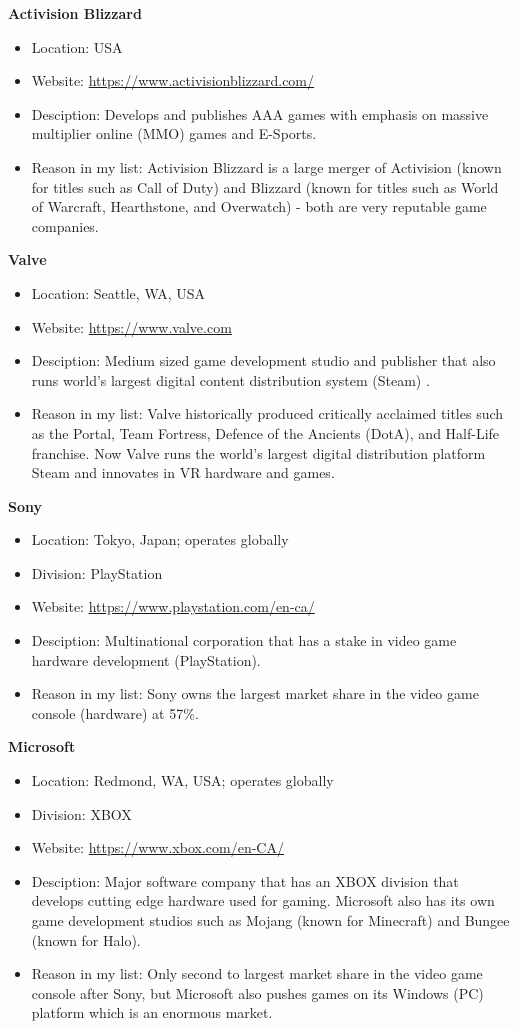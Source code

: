 \documentclass[10pt,letterpaper]{article}
\begin{document}
\textbf{Activision Blizzard}
\begin{itemize}
	\item Location: USA
	\item Website: \url{https://www.activisionblizzard.com/}
	\item Desciption: Develops and publishes AAA games with emphasis on massive multiplier online (MMO) games and E-Sports.
	\item Reason in my list: Activision Blizzard is a large merger of Activision (known for titles such as Call of Duty) and Blizzard (known for titles such as World of Warcraft, Hearthstone, and Overwatch) - both are very reputable game companies.
\end{itemize}

\textbf{Valve}
\begin{itemize}
	\item Location: Seattle, WA, USA
	\item Website: \url{https://www.valve.com}
	\item Desciption: Medium sized game development studio and publisher that also runs world's largest digital content distribution system (Steam) \cite{steam}.
	\item Reason in my list: Valve historically produced critically acclaimed titles such as the Portal, Team Fortress, Defence of the Ancients (DotA), and Half-Life franchise. Now Valve runs the world's largest digital distribution platform Steam\cite{steam} and innovates in VR hardware and games.
\end{itemize}

\textbf{Sony}
\begin{itemize}
	\item Location: Tokyo, Japan; operates globally
	\item Division: PlayStation
	\item Website: \url{https://www.playstation.com/en-ca/}
	\item Desciption: Multinational corporation that has a stake in video game hardware development (PlayStation).
	\item Reason in my list: Sony owns the largest market share in the video game console (hardware) at 57\%\cite{ps-market}.
\end{itemize}

\textbf{Microsoft}
\begin{itemize}
	\item Location: Redmond, WA, USA; operates globally
	\item Division: XBOX
	\item Website: \url{https://www.xbox.com/en-CA/}
	\item Desciption: Major software company that has an XBOX division that develops cutting edge hardware used for gaming. Microsoft also has its own game development studios such as Mojang (known for Minecraft) and Bungee (known for Halo).
	\item Reason in my list: Only second to largest market share in the video game console after Sony, but Microsoft also pushes games on its Windows (PC) platform which is an enormous market.
\end{itemize}
\end{document}

